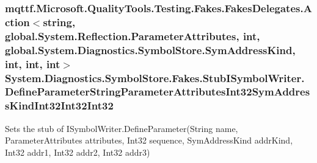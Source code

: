 \hypertarget{class_system_1_1_diagnostics_1_1_symbol_store_1_1_fakes_1_1_stub_i_symbol_writer_a4e3bf4e643901404bc5c2130282f10fa}{
\subsubsection[{Define\-Parameter\-String\-Parameter\-Attributes\-Int32\-Sym\-Address\-Kind\-Int32\-Int32\-Int32}]{\setlength{\rightskip}{0pt plus 5cm}mqttf.\-Microsoft.\-Quality\-Tools.\-Testing.\-Fakes.\-Fakes\-Delegates.\-Action$<$string, global.\-System.\-Reflection.\-Parameter\-Attributes, int, global.\-System.\-Diagnostics.\-Symbol\-Store.\-Sym\-Address\-Kind, int, int, int$>$ System.\-Diagnostics.\-Symbol\-Store.\-Fakes.\-Stub\-I\-Symbol\-Writer.\-Define\-Parameter\-String\-Parameter\-Attributes\-Int32\-Sym\-Address\-Kind\-Int32\-Int32\-Int32}}\label{class_system_1_1_diagnostics_1_1_symbol_store_1_1_fakes_1_1_stub_i_symbol_writer_a4e3bf4e643901404bc5c2130282f10fa}


Sets the stub of I\-Symbol\-Writer.\-Define\-Parameter(\-String name, Parameter\-Attributes attributes, Int32 sequence, Sym\-Address\-Kind addr\-Kind, Int32 addr1, Int32 addr2, Int32 addr3)


